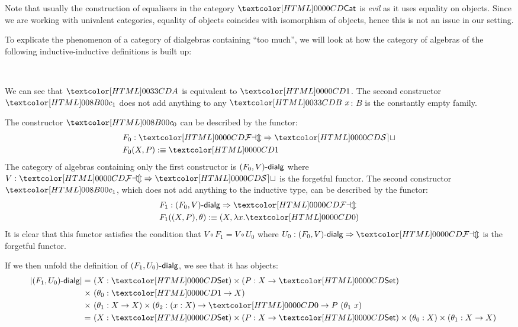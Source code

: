 Note that usually the construction of equalisers in the category
$\Cat$ is \emph{evil} as it uses equality on objects. Since we are
working with univalent categories, equality of objects coincides with
isomorphism of objects, hence this is not an issue in our setting.

\begin{remark}
  To explicate the phenomenon of a category of dialgebras containing
  ``too much'', we will look at how the category of algebras of the
  following inductive-inductive definitions is built up:
  \begin{sorts}
    \sortnamety{\Aty}{\Set} \\
    \sortnamety{\Bty}{\Aty \to \Set}
  \end{sorts}
  \begin{datatype}{\Aty}{}
    \constr{\Aco}{\Aty}
  \end{datatype}
  \begin{datatype}{\Bty}{}
  \end{datatype}
  We can see that $\Aty$ is equivalent to $\unitty$. The second
  constructor $\Bci$ does not add anything to any $\Bty\ x$: $B$ is
  the constantly empty family.

  The constructor $\Aco$ can be described by
  the functor:
  \begin{align*}
    &F_0 : \Func{\FAM}{\SET} \\
    &F_0 (X , P) \ddefeq \unitty
  \end{align*}
  The category of algebras containing only the first constructor is
  $\dialgcat{F_0}{V}$ where $V : \Func{\FAM}{\SET}$ is the forgetful
  functor. The second constructor $\Bci$, which does not add anything
  to the inductive type, can be described by the functor:
  \begin{align*}
    &F_1 : \Func{\dialgcat{F_0}{V}}{\FAM} \\
    &F_1 ((X , P) , \theta) \ddefeq (X , \lambda x . \emptyty)
  \end{align*}
  It is clear that this functor satisfies the condition that
  $V \circ F_1 = V \circ U_0$ where
  $U_0 : \Func{\dialgcat{F_0}{V}}{\FAM}$ is the forgetful functor.

  If we then unfold the definition of $\dialgcat{F_1}{U_0}$, we see
  that it has objects:
  \begin{align*}
    &&| \dialgcat{F_1}{U_0} | = &\ (X : \Set) \times (P : X \to \Set) \\
    &&\times&\ (\theta_0 : \unitty \to X) \\
    &&\times&\ (\theta_1 : X \to X) \times (\theta_2 :  (x : X) \to \emptyty \to P\ (\theta_1\ x) \\
    &&=&\ (X : \Set) \times (P : X \to \Set) \times (\theta_0 : X) \times (\theta_1 : X \to X)
  \end{align*}
  

\end{remark}
